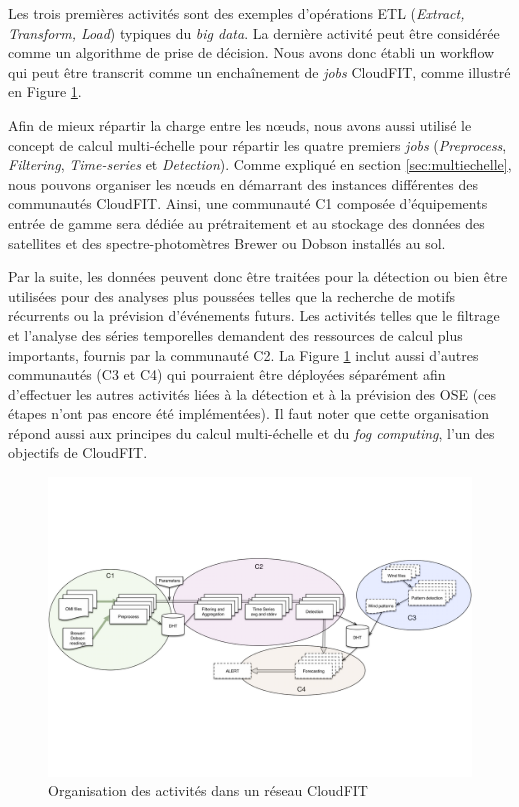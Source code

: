 Les trois premières activités sont des exemples d'opérations ETL (\textit{Extract, Transform, Load}) typiques du \textit{big data}. La dernière activité peut être considérée comme un algorithme de prise de décision. Nous avons donc établi un workflow qui peut être transcrit comme un enchaînement de \textit{jobs} CloudFIT, comme illustré en Figure \ref{fig:blocs}. 

Afin de mieux répartir la charge entre les n{\oe}uds, nous avons aussi utilisé le concept de calcul multi-échelle pour répartir les quatre premiers \textit{jobs} (\textit{Preprocess}, \textit{Filtering}, \textit{Time-series} et \textit{Detection}). Comme expliqué en section \ref{sec:multiechelle}, nous pouvons organiser les n{\oe}uds en démarrant des instances différentes des communautés CloudFIT. Ainsi, une communauté C1 composée d'équipements entrée de gamme sera dédiée au prétraitement et au stockage des données des satellites et des spectre-photomètres Brewer ou Dobson installés au sol. 

Par la suite, les données peuvent donc être traitées pour la détection ou bien être utilisées pour des analyses plus poussées telles que la recherche de motifs récurrents ou la prévision d'événements futurs. Les activités telles que le filtrage et l'analyse des séries temporelles demandent des ressources de calcul plus importants, fournis par la communauté C2.
La Figure \ref{fig:blocs} inclut aussi d'autres communautés (C3 et C4) qui pourraient être déployées séparément afin d'effectuer les autres activités liées à la détection et à la prévision des OSE (ces étapes n'ont pas encore été implémentées). Il faut noter que cette organisation répond aussi aux principes du calcul multi-échelle et du \textit{fog computing}, l'un des objectifs de CloudFIT.

\begin{figure}
	\centering
	\includegraphics[width=1\linewidth]{img/4-process}
	\caption{Organisation des activités dans un réseau CloudFIT}\label{fig:blocs}
\end{figure}

